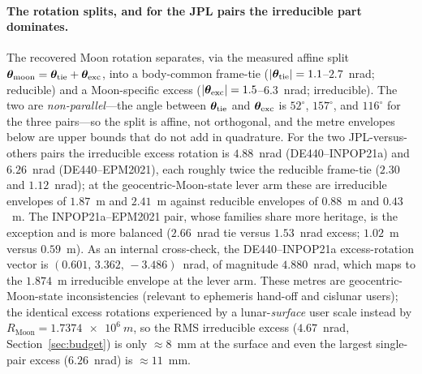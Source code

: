 \paragraph{The rotation splits, and for the JPL pairs the irreducible part
dominates.} The recovered Moon rotation separates, via the measured affine split
$\bm{\theta}_{\mathrm{moon}}=\bm{\theta}_{\mathrm{tie}}+\bm{\theta}_{\mathrm{exc}}$, into a body-common
frame-tie ($|\bm{\theta}_{\mathrm{tie}}|=1.1$--$2.7$~nrad; reducible) and a Moon-specific
excess ($|\bm{\theta}_{\mathrm{exc}}|=1.5$--$6.3$~nrad; irreducible). The two are
\emph{non-parallel}---the angle between $\bm{\theta}_{\mathrm{tie}}$ and $\bm{\theta}_{\mathrm{exc}}$
is $52^\circ$, $157^\circ$, and $116^\circ$ for the three pairs---so the split is
affine, not orthogonal, and the metre envelopes below are upper bounds that do not add
in quadrature. For the two JPL-versus-others pairs the irreducible excess rotation is
$4.88$~nrad (DE440--INPOP21a) and $6.26$~nrad (DE440--EPM2021), each roughly twice the
reducible frame-tie ($2.30$ and $1.12$~nrad); at the geocentric-Moon-state lever arm
these are irreducible envelopes of $1.87$~m and $2.41$~m against reducible envelopes of
$0.88$~m and $0.43$~m. The INPOP21a--EPM2021 pair, whose families share more heritage,
is the exception and is more balanced ($2.66$~nrad tie versus $1.53$~nrad excess;
$1.02$~m versus $0.59$~m). As an internal cross-check, the DE440--INPOP21a
excess-rotation vector is $(0.601,\,3.362,\,-3.486)$~nrad, of magnitude $4.880$~nrad,
which maps to the $1.874$~m irreducible envelope at the lever arm. These metres are
geocentric-Moon-state inconsistencies (relevant to ephemeris hand-off and cislunar
users); the identical excess rotations experienced by a lunar-\emph{surface} user
scale instead by $R_{\mathrm{Moon}}=\SI{1.7374e6}{m}$, so the RMS irreducible excess
($4.67$~nrad, Section~\ref{sec:budget}) is only $\approx\!8$~mm at the surface and even
the largest single-pair excess ($6.26$~nrad) is $\approx\!11$~mm.


